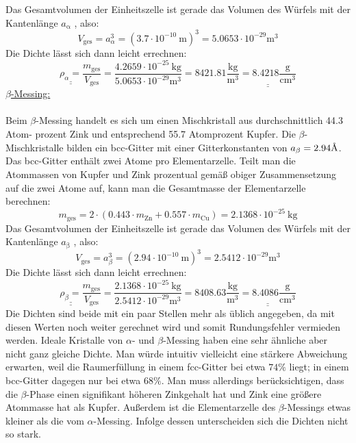 \documentclass[german,  %
parskip=full,  %
]{scrartcl}
\begin{document}
Das Gesamtvolumen der Einheitszelle ist gerade das Volumen des Würfels mit der Kantenlänge \(a_{\mathrm{\alpha}}\) , also:
\[V_{\mathrm{ges}} = a_{\alpha}^3 = \left(3.7\cdot 10^{-10} \ \mathrm{m}\right)^3 = 5.0653\cdot 10^{-29} \mathrm{m}^3\]
Die Dichte lässt sich dann leicht errechnen:
\[\underline{\underline{\rho_{\alpha} =  }} \frac{m_{\mathrm{ges}}}{V_{\mathrm{ges}}} = \frac{4.2659 \cdot 10^{-25} \ \mathrm{kg}}{5.0653\cdot 10^{-29} \mathrm{m}^3} = 8421.81 \frac{\mathrm{kg}}{\mathrm{m}^3} \underline{\underline{= 8.4218 \frac{\mathrm{g}}{\mathrm{cm}^3}}}\]
\underline{\(\beta\)-Messing:} \\\\
Beim \(\beta\)-Messing handelt es sich um einen Mischkristall aus durchschnittlich 44.3 Atom-
prozent Zink und entsprechend 55.7 Atomprozent Kupfer. Die \(\beta\)-Mischkristalle bilden ein
bcc-Gitter mit einer Gitterkonstanten von \(a_{\beta} = 2.94 \text{\r A}\). Das bcc-Gitter enthält zwei Atome pro Elementarzelle. Teilt man die Atommassen von Kupfer und Zink prozentual gemäß
obiger Zusammensetzung auf die zwei Atome auf, kann man die Gesamtmasse der Elementarzelle berechnen:
\[m_{\mathrm{ges}} = 2\cdot (0.443\cdot m_{\mathrm{Zn}} + 0.557 \cdot m_{\mathrm{Cu}}) = 2.1368 \cdot 10^{-25} \ \mathrm{kg}\]
Das Gesamtvolumen der Einheitszelle ist gerade das Volumen des Würfels mit der Kantenlänge \(a_{\mathrm{\beta}}\) , also:
\[V_{\mathrm{ges}} = a_{\beta}^3 = \left(2.94\cdot 10^{-10} \ \mathrm{m}\right)^3 = 2.5412\cdot 10^{-29} \mathrm{m}^3\]
Die Dichte lässt sich dann leicht errechnen:
\[\underline{\underline{\rho_{\beta} =  }} \frac{m_{\mathrm{ges}}}{V_{\mathrm{ges}}} = \frac{2.1368 \cdot 10^{-25} \ \mathrm{kg}}{2.5412\cdot 10^{-29} \mathrm{m}^3} = 8408.63 \frac{\mathrm{kg}}{\mathrm{m}^3} \underline{\underline{= 8.4086 \frac{\mathrm{g}}{\mathrm{cm}^3}}}\]
Die Dichten sind beide mit ein paar Stellen mehr als üblich angegeben, da mit diesen
Werten noch weiter gerechnet wird und somit Rundungsfehler vermieden werden. Ideale
Kristalle von \(\alpha\)- und \(\beta\)-Messing haben eine sehr ähnliche aber nicht ganz gleiche Dichte.
Man würde intuitiv vielleicht eine stärkere Abweichung erwarten, weil die Raumerfüllung
in einem fcc-Gitter bei etwa \(74 \%\) liegt; in einem bcc-Gitter dagegen nur bei etwa \(68 \% \).
Man muss allerdings berücksichtigen, dass die \(\beta\)-Phase einen signifikant höheren Zinkgehalt hat und Zink eine größere Atommasse hat als Kupfer. Außerdem ist die Elementarzelle des \(\beta\)-Messings etwas kleiner als die vom \(\alpha\)-Messing. Infolge dessen unterscheiden
sich die Dichten nicht so stark.
\end{document}

